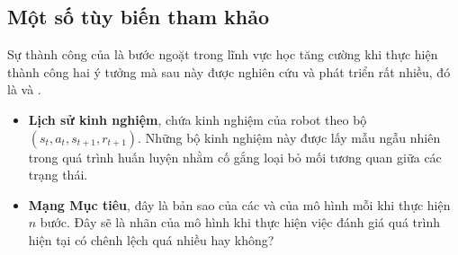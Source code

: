 \subsection{Một số tùy biến tham khảo}\label{ref_app}
Sự thành công của \cite{DBLP:journals/corr/MnihKSGAWR13} là bước ngoặt trong lĩnh vực học tăng cường khi thực hiện thành công hai ý tưởng mà sau này được nghiên cứu và phát triển rất nhiều, đó là và .
\begin{itemize}
    \item \textbf{Lịch sử kinh nghiệm}, chứa kinh nghiệm của robot theo bộ $(s_t, a_t, s_{t+1}, r_{t+1})$. Những bộ kinh nghiệm này được lấy mẫu ngẫu nhiên trong quá trình huấn luyện nhằm cố gắng loại bỏ mối tương quan giữa các trạng thái.
    \item \textbf{Mạng Mục tiêu}, đây là bản sao của các  và  của mô hình mỗi khi thực hiện $n$ bước. Đây sẽ là nhãn của mô hình khi thực hiện việc đánh giá quá trình hiện tại có chênh lệch quá nhiều hay không?
\end{itemize}
